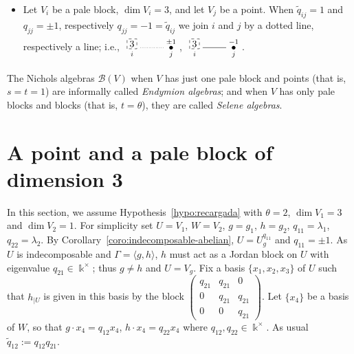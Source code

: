 \documentclass[10pt,a4paper]{amsart}
\numberwithin{equation}{section}
\newcommand{\toba}{\mathscr B}
\newcommand{\eny}{\mathfrak{E}}
\begin{document}
\begin{itemize}
If $\widetilde{q}_{ij}=-1$ and $q_{jj} = - 1$,
then we draw and edge labeled by $a_{j}$ between $i$ and $j$, i.e.,
$\xymatrix{ \underset{i}{\begin{tikzpicture}
\draw[dashed] (0,0) rectangle (0.36,0.36);
\end{tikzpicture}} \ar @{-}^{a_{j}}[r] & \overset{-1}{\underset{j}{\bullet}}}$\!.
Note that $V_i \oplus V_j \simeq \eny_{\star}(q)$ if $a_j \neq 0$.

\item Let $V_i$ be a pale block, $\dim V_i = 3$, and let $V_j$ be a point.
When $\widetilde{q}_{ij}=1$ and $q_{jj} = \pm 1$, respectively $q_{jj} = - 1=\widetilde{q}_{ij}$
we join $i$ and $j$ by a dotted line, respectively a line; i.e.,
$\xymatrix{ \underset{i}{\begin{tikzpicture}
\draw[dashed] (0,0) rectangle node[pos=.5] {$3$} (0.36,0.36);
\end{tikzpicture}} \ar @{.}[r] & \overset{\pm1}{\underset{j}{\bullet}}}$\!,
$\xymatrix{ \underset{i}{\begin{tikzpicture}
\draw[dashed] (0,0) rectangle node[pos=.5] {$3$} (0.36,0.36);
\end{tikzpicture}} \ar @{-}[r] & \overset{-1}{\underset{j}{\bullet}}}$\!.
\end{itemize}

The Nichols algebras $\toba(V)$ when $V$ has just one pale block and points (that is, $s=t=1$)
are informally called \emph{Endymion algebras}; and when $V$ has only pale blocks and blocks (that is, $t = \theta$),
they are called \emph{Selene algebras}.





\section{A point and a pale block of dimension 3} \label{sec:block+pt}

In this section, we assume Hypothesis~\ref{hypo:recargada} with $\theta = 2$, $\dim V_1= 3$ and $\dim V_2 = 1$.
For simplicity set $U = V_{1}$, $W = V_{2}$, $g = g_{1}$, $h = g_{2}$, $ q_{11}= \lambda_1$, $ q_{22}= \lambda_2$.
By Corollary~\ref{coro:indecomposable-abelian}, $U = U_g^{q_{11}}$ and $q_{11} = \pm 1$.
As $U$ is indecomposable and $\Gamma = \langle g,h \rangle$, $h$ must act as a Jordan block on $U$ with eigenvalue $q_{21} \in \Bbbk^{\times}$;
thus $g \neq h$ and $U = V_g$.
Fix a basis $\big\{x_1, x_2, x_{3}\big\}$ of $U$ such that $h_{\vert U}$ is given in this basis by the block
$\left(\begin{smallmatrix}
q_{21} & q_{21} & 0 \\
0 & q_{21} & q_{21} \\
0 & 0 & q_{21}
\end{smallmatrix}\right)$.
Let $\{x_{4}\}$ be a basis of $W$, so that $g\cdot x_{4} = q_{12}x_{4}$, $h\cdot x_{4} = q_{22}x_{4}$
where $q_{12}, q_{22} \in \Bbbk^{\times}$.
As usual $\widetilde{q}_{12} := q_{12}q_{21}$.
\end{document}
